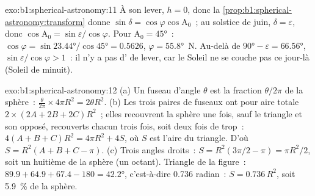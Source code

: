 \begin{solution}{exo:b1:spherical-astronomy:11}
À son lever, $h = 0$, donc la \cref{prop:b1:spherical-astronomy:transform}
donne $\sin\delta = \cos\varphi\cos\mathrm{A}_0$~; au solstice de juin,
$\delta = \varepsilon$, donc $\cos\mathrm{A}_0 = \sin\varepsilon/\cos\varphi$.
Pour $\mathrm{A}_0 = \ang{45}$~: $\cos\varphi = \sin\ang{23.44}/\cos\ang{45} =
0.5626$, $\varphi = \ang{55.8}$~N. Au-delà de $\ang{90} - \varepsilon =
\ang{66.56}$, $\sin\varepsilon/\cos\varphi > 1$~: il n'y a pas d' de
lever, car le Soleil ne se couche pas ce jour-là (Soleil de minuit).
\end{solution}

\begin{solution}{exo:b1:spherical-astronomy:12}
(a) Un fuseau d'angle $\theta$ est la fraction $\theta/2\pi$ de la sphère~:
$\frac{\theta}{2\pi}\times4\pi R^2 = 2\theta R^2$. (b) Les trois paires de
fuseaux ont pour aire totale $2\times(2A + 2B + 2C)R^2$~; elles recouvrent la
sphère une fois, sauf le triangle et son opposé, recouverts chacun trois fois,
soit deux fois de trop~: $4(A + B + C)R^2 = 4\pi R^2 + 4S$, où $S$ est l'aire du
triangle. D'où $S = R^2(A + B + C - \pi)$. (c) Trois angles droits~:
$S = R^2(3\pi/2 - \pi) = \pi R^2/2$, soit un huitième de la sphère (un octant).
Triangle de la figure~: $89.9 + 64.9 + 67.4 - 180 = \ang{42.2}$, c'est-à-dire
\num{0.736} radian~: $S = 0.736\,R^2$, soit \qty{5.9}{\percent} de la sphère.
\end{solution}

